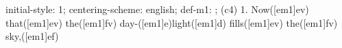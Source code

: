initial-style: 1;
centering-scheme: english;
def-m1: \grealign;
(c4) 1. Now([em1]ev) that([em1]ev) the([em1]fv) day-([em1]e)light([em1]d) fills([em1]ev) the([em1]fv) sky,([em1]ef)